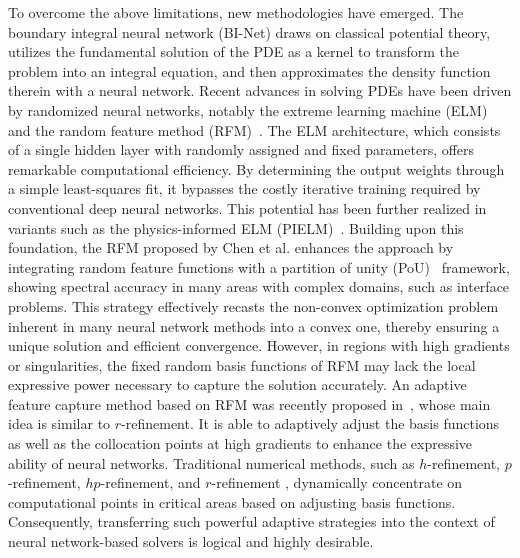 \documentclass{article}
\theoremstyle{plain}
\theoremstyle{definition}
\begin{document}
To overcome the above limitations, new methodologies have emerged. The boundary integral neural network (BI-Net) \cite{lin2023bi} draws on classical potential theory,  utilizes the fundamental solution of the PDE as a kernel to transform the problem into an integral equation, and then approximates the density function therein with a neural network. Recent advances in solving PDEs have been driven by randomized neural networks, notably the extreme learning machine (ELM)~\cite{dong2021local,wang2024extreme}  and the random feature method (RFM)~\cite{chen2022bridging}. The ELM architecture, which consists of a single hidden layer with randomly assigned and fixed parameters, offers remarkable computational efficiency. By determining the output weights through a simple least-squares fit, it bypasses the costly iterative training required by conventional deep neural networks.  This potential has been further realized in variants such as the physics-informed ELM (PIELM)~\cite{chen2022bridging,dwivedi2020physics}. Building upon this foundation, the RFM proposed by Chen et al. enhances the approach by integrating random feature functions with a partition of unity (PoU)~\cite{chen2022bridging} framework, showing spectral accuracy in many areas with complex domains,  such as interface problems\cite{chi2024random}. This strategy effectively recasts the non-convex optimization problem inherent in many neural network methods into a convex one, thereby ensuring a unique solution and efficient convergence. However, in regions with high gradients or singularities, the fixed random basis functions of RFM may lack the local expressive power necessary to capture the solution accurately. An adaptive feature capture method based on RFM was recently proposed in~\cite{deng2025adaptive}, whose main idea is similar to $r$-refinement. It is able to adaptively adjust the basis functions as well as the collocation points at high gradients to enhance the expressive ability of neural networks. Traditional numerical methods, such as $h$-refinement, $p$-refinement, $hp$-refinement, and $r$-refinement \cite{gui1986h1,gui1986h2,babuska1981p,babuvska1990p,mclean2000elliptic,zegeling1998r}, dynamically concentrate on computational points in critical areas based on adjusting basis functions. Consequently, transferring such powerful adaptive strategies into the context of neural network-based solvers is logical and highly desirable.
\end{document}
